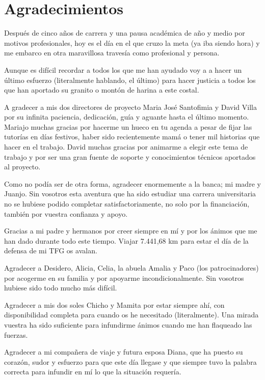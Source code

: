 \chapter{Agradecimientos}

Después de cinco años de carrera y una pausa académica de año y medio por motivos profesionales, hoy es el día en el que cruzo la meta (ya iba siendo hora) y me embarco en otra maravillosa travesía como profesional y persona.

Aunque es difícil recordar a todos los que me han ayudado voy a a hacer un último esfuerzo (literalmente hablando, el último) para hacer justicia a todos los que han aportado su granito o montón de harina a este costal.

A gradecer a mis dos directores de proyecto Maria José Santofimia y David Villa por su infinita paciencia, dedicación, guía y aguante hasta el último momento. Mariajo muchas gracias por hacerme un hueco en tu agenda a pesar de fijar las tutorías en días festivos, haber sido recientemente mamá o tener mil historias que hacer en el trabajo. David muchas gracias por animarme a elegir este tema de trabajo y por ser una gran fuente de soporte y conocimientos técnicos aportados al proyecto.

Como no podía ser de otra forma, agradecer enormemente a la banca; mi madre y Juanjo. Sin vosotros esta aventura que ha sido estudiar una carrera universitaria no se hubiese podido completar satisfactoriamente, no solo por la financiación, también por vuestra confianza y apoyo. 

Gracias a mi padre y hermanos por creer siempre en mí y por los ánimos que me han dado durante todo este tiempo. Viajar 7.441,68 km para estar el día de la defensa de mi \acs{TFG} os avalan.

Agradecer a Desidero, Alicia, Celia, la abuela Amalia y Paco (los patrocinadores) por acogerme en su familia y por apoyarme incondicionalmente. Sin vosotros hubiese sido todo mucho más difícil.

Agradecer a mis dos soles Chicho y Mamita por estar siempre ahí, con disponibilidad completa para cuando os he necesitado (literalmente). Una mirada vuestra ha sido suficiente para infundirme ánimos cuando me han flaqueado las fuerzas.

Agradecer a mi compañera de viaje y futura esposa Diana, que ha puesto su corazón, sudor y esfuerzo para que este día llegase y que siempre tuvo la palabra correcta para infundir en mí lo que la situación requería.


